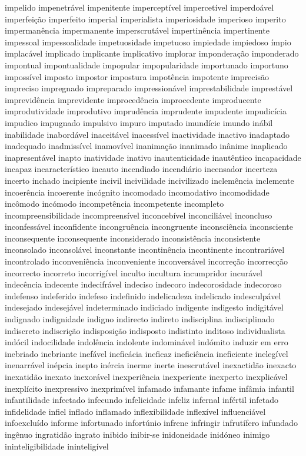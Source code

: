 \begin{appendices}
impelido impenetr\'{a}vel impenitente impercept\'{i}vel impercet\'{i}vel imperdo\'{a}vel imperfei\c{c}\~ao imperfeito imperial imperialista imperiosidade imperioso imperito imperman\^{e}ncia impermanente imperscrut\'{a}vel impertin\^{e}ncia impertinente impessoal impessoalidade impetuosidade impetuoso impiedade impiedoso \'{i}mpio implac\'{a}vel implicado implicante implicativo implorar impondera\c{c}\~ao imponderado impontual impontualidade impopular impopularidade importunado importuno imposs\'{i}vel imposto impostor impostura impot\^{e}ncia impotente imprecis\~ao impreciso impregnado impreparado impression\'{a}vel imprestabilidade imprest\'{a}vel imprevid\^{e}ncia imprevidente improced\^{e}ncia improcedente improducente improdutividade improdutivo imprud\^{e}ncia imprudente impudente impudic\'{i}cia impudico impugnado impulsivo impuro imputado imund\'{i}cie imundo in\'{a}bil inabilidade inabord\'{a}vel inaceit\'{a}vel inacess\'{i}vel inactividade inactivo inadaptado inadequado inadmiss\'{i}vel inamov\'{i}vel inanima\c{c}\~ao inanimado in\^{a}nime inaplicado inapresent\'{a}vel inapto inatividade inativo inautenticidade inaut\^{e}ntico incapacidade incapaz incaracter\'{i}stico incauto incendiado incendi\'{a}rio incensador incerteza incerto inchado incipiente incivil incivilidade incivilizado inclem\^{e}ncia inclemente incoer\^{e}ncia incoerente inc\'{o}gnito incomodado incomodativo incomodidade inc\^{o}modo inc\'{o}modo incompet\^{e}ncia incompetente incompleto incompreensibilidade incompreens\'{i}vel inconceb\'{i}vel inconcili\'{a}vel inconcluso inconfess\'{a}vel inconfidente incongru\^{e}ncia incongruente inconsci\^{e}ncia inconsciente inconsequente inconsequente inconsiderado inconsist\^{e}ncia inconsistente inconsolado inconsol\'{a}vel inconstante incontin\^{e}ncia incontinente incontrari\'{a}vel incontrolado inconveni\^{e}ncia inconveniente inconvers\'{a}vel incorre\c{c}\~ao incorrec\c{c}\~ao incorrecto incorreto incorrig\'{i}vel inculto incultura incumpridor incur\'{a}vel indec\^{e}ncia indecente indecifr\'{a}vel indeciso indecoro indecorosidade indecoroso indefenso indeferido indefeso indefinido indelicadeza indelicado indesculp\'{a}vel indesejado indesej\'{a}vel indeterminado indiciado indigente indigesto indigit\'{a}vel indignado indignidade indigno indirecto indireto indisciplina indisciplinado indiscreto indiscri\c{c}\~ao indisposi\c{c}\~ao indisposto indistinto inditoso individualista ind\'{o}cil indocilidade indol\^{e}ncia indolente indomin\'{a}vel ind\'{o}mito induzir em erro inebriado inebriante inef\'{a}vel inefic\'{a}cia ineficaz inefici\^{e}ncia ineficiente ineleg\'{i}vel inenarr\'{a}vel in\'{e}pcia inepto in\'{e}rcia inerme inerte inescrut\'{a}vel inexactid\~ao inexacto inexatid\~ao inexato inexor\'{a}vel inexperi\^{e}ncia inexperiente inexperto inexplic\'{a}vel inexpl\'{i}cito inexpressivo inexprim\'{i}vel infamado infamante infame inf\^{a}mia infantil infantilidade infectado infecundo infelicidade infeliz infernal inf\'{e}rtil infetado infidelidade infiel inflado inflamado inflexibilidade inflex\'{i}vel influenci\'{a}vel infoexclu\'{i}do informe infortunado infort\'{u}nio infrene infringir infrut\'{i}fero infundado ing\^{e}nuo ingratid\~ao ingrato inibido inibir-se inidoneidade inid\'{o}neo inimigo ininteligibilidade inintelig\'{i}vel 
\end{appendices}

